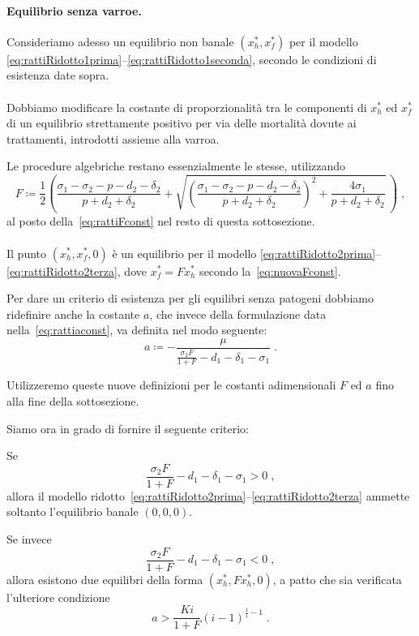 \paragraph{Equilibrio senza varroe. } Consideriamo adesso un equilibrio non banale $(x_h^*, x_f^*)$ per il modello \eqref{eq:rattiRidotto1prima}--\eqref{eq:rattiRidotto1seconda}, secondo le condizioni di esistenza date sopra.

\paragraph{}
Dobbiamo modificare la costante di proporzionalità tra le componenti di $x_h^*$ ed $x_f^*$ di un equilibrio
strettamente positivo per via delle mortalità dovute ai trattamenti, introdotti assieme alla varroa.

Le procedure algebriche restano essenzialmente le stesse, utilizzando
\begin{equation}
F \coloneq \frac{1}{2} \left( \frac{ \sigma_1 - \sigma_2 - p - d_2 -\delta_2}{p+d_2+\delta_2} +
    \sqrt{ {\left( \frac{ \sigma_1 - \sigma_2 - p - d_2 -\delta_2 }{p+d_2+\delta_2} \right)}^2 + \frac{4 \sigma_1}{p+d_2+\delta_2} } \, \right) \; ,
    \label{eq:nuovaFconst}
\end{equation}
al posto della~\eqref{eq:rattiFconst} nel resto di questa sottosezione.

\paragraph{}
Il punto $(x_h^*, x_f^*, 0)$ è un equilibrio per il modello \eqref{eq:rattiRidotto2prima}--\eqref{eq:rattiRidotto2terza}, dove $x_f^* = F x_h^*$ secondo la~\eqref{eq:nuovaFconst}.

Per dare un criterio di esistenza per gli equilibri senza patogeni dobbiamo ridefinire anche la costante $a$,
che invece della formulazione data nella~\eqref{eq:rattiaconst}, va definita nel modo seguente:
\begin{equation}
    a \coloneq - \frac{\mu}{ \frac{\sigma_2 F}{1+F} - d_1 -\delta_1 - \sigma_1}
    \; .
\label{eq:nuovaaconst}
\end{equation}

Utilizzeremo queste nuove definizioni per le costanti adimensionali $F$ ed $a$ fino alla fine della sottosezione.

Siamo ora in grado di fornire il seguente criterio:

\begin{proposizione}
Se
$$\frac{\sigma_2 F}{1+F} - d_1 -\delta_1 -\sigma_1 > 0 \; ,$$
allora il modello ridotto~\eqref{eq:rattiRidotto2prima}--\eqref{eq:rattiRidotto2terza} ammette
soltanto l'equilibrio banale $(0,0,0)$.

Se invece
$$\frac{\sigma_2 F}{1+F} - d_1 -\delta_1 -\sigma_1 < 0 \; ,$$
allora esistono due equilibri della forma $(x_h^*, F x_h^*, 0)$,
a patto che sia verificata l'ulteriore condizione
$$a > \frac{Ki}{1+F} {(i-1)}^{\frac{1}{i} -1} \; .$$
\label{prop:exist3D}
\end{proposizione}

